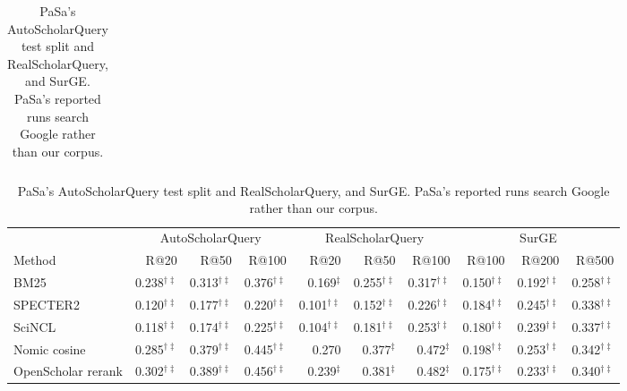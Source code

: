 \begin{table}[t]
\begin{subtable}{\textwidth}
\begin{tabular}{lrrrrrrrrr}
\end{tabular}
\end{subtable}
\vspace{6pt}
\begin{subtable}{\textwidth}
\centering
\caption{PaSa's AutoScholarQuery test split and RealScholarQuery, and SurGE. PaSa's reported runs search Google rather than our corpus.}
\label{tab:existing}
\begin{tabular}{lrrrrrrrrr}
\toprule
 & \multicolumn{3}{c}{AutoScholarQuery} & \multicolumn{3}{c}{RealScholarQuery} & \multicolumn{3}{c}{SurGE} \\
\cmidrule(lr){2-4}\cmidrule(lr){5-7}\cmidrule(lr){8-10}
Method & R@20 & R@50 & R@100 & R@20 & R@50 & R@100 & R@100 & R@200 & R@500 \\
\midrule
BM25 & 0.238$^{\dagger\ddagger}$ & 0.313$^{\dagger\ddagger}$ & 0.376$^{\dagger\ddagger}$ & 0.169$^{\ddagger}$ & 0.255$^{\dagger\ddagger}$ & 0.317$^{\dagger\ddagger}$ & 0.150$^{\dagger\ddagger}$ & 0.192$^{\dagger\ddagger}$ & 0.258$^{\dagger\ddagger}$ \\
SPECTER2 & 0.120$^{\dagger\ddagger}$ & 0.177$^{\dagger\ddagger}$ & 0.220$^{\dagger\ddagger}$ & 0.101$^{\dagger\ddagger}$ & 0.152$^{\dagger\ddagger}$ & 0.226$^{\dagger\ddagger}$ & 0.184$^{\dagger\ddagger}$ & 0.245$^{\dagger\ddagger}$ & 0.338$^{\dagger\ddagger}$ \\
SciNCL & 0.118$^{\dagger\ddagger}$ & 0.174$^{\dagger\ddagger}$ & 0.225$^{\dagger\ddagger}$ & 0.104$^{\dagger\ddagger}$ & 0.181$^{\dagger\ddagger}$ & 0.253$^{\dagger\ddagger}$ & 0.180$^{\dagger\ddagger}$ & 0.239$^{\dagger\ddagger}$ & 0.337$^{\dagger\ddagger}$ \\
Nomic cosine & 0.285$^{\dagger\ddagger}$ & 0.379$^{\dagger\ddagger}$ & 0.445$^{\dagger\ddagger}$ & 0.270 & 0.377$^{\ddagger}$ & 0.472$^{\ddagger}$ & 0.198$^{\dagger\ddagger}$ & 0.253$^{\dagger\ddagger}$ & 0.342$^{\dagger\ddagger}$ \\
OpenScholar rerank & 0.302$^{\dagger\ddagger}$ & 0.389$^{\dagger\ddagger}$ & 0.456$^{\dagger\ddagger}$ & 0.239$^{\ddagger}$ & 0.381$^{\ddagger}$ & 0.482$^{\ddagger}$ & 0.175$^{\dagger\ddagger}$ & 0.233$^{\dagger\ddagger}$ & 0.340$^{\dagger\ddagger}$ \\

\end{tabular}
\end{subtable}
\end{table}
